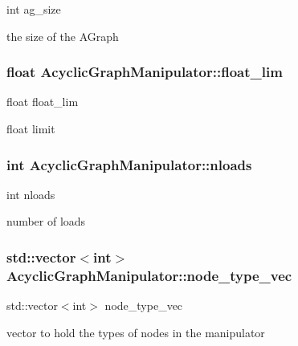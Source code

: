 int ag\+\_\+size 

the size of the A\+Graph 
\subsubsection[{\texorpdfstring{float\+\_\+lim}{float_lim}}]{\setlength{\rightskip}{0pt plus 5cm}float Acyclic\+Graph\+Manipulator\+::float\+\_\+lim}\hypertarget{classAcyclicGraphManipulator_a6591f90b81ad497237fc80e923dae793}{}\label{classAcyclicGraphManipulator_a6591f90b81ad497237fc80e923dae793}


float float\+\_\+lim 

float limit 
\subsubsection[{\texorpdfstring{nloads}{nloads}}]{\setlength{\rightskip}{0pt plus 5cm}int Acyclic\+Graph\+Manipulator\+::nloads}\hypertarget{classAcyclicGraphManipulator_abaabd6c4fb4cee6b7adfc3fc146fb395}{}\label{classAcyclicGraphManipulator_abaabd6c4fb4cee6b7adfc3fc146fb395}


int nloads 

number of loads 
\subsubsection[{\texorpdfstring{node\+\_\+type\+\_\+vec}{node_type_vec}}]{\setlength{\rightskip}{0pt plus 5cm}std\+::vector$<$int$>$ Acyclic\+Graph\+Manipulator\+::node\+\_\+type\+\_\+vec}\hypertarget{classAcyclicGraphManipulator_aa0e85eda232a3dd36fe170b5b67e5e57}{}\label{classAcyclicGraphManipulator_aa0e85eda232a3dd36fe170b5b67e5e57}


std\+::vector$<$int$>$ node\+\_\+type\+\_\+vec 

vector to hold the types of nodes in the manipulator 
